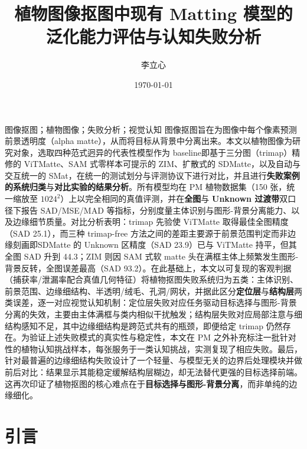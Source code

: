 \documentclass[supercite]{HustGraduPaper}
\title{植物图像抠图中现有 Matting 模型的\\泛化能力评估与认知失败分析} %
\author{李立心} %
\date{\today} %
\begin{document}
	\maketitle

	\clearpage %

\begin{cnabstract}{图像抠图；植物图像；失败分析；视觉认知}
	图像抠图旨在为图像中每个像素预测前景透明度（alpha matte），从而将目标从背景中分离出来。本文以植物图像为研究对象，选取四种范式迥异的代表性模型作为 baseline即基于三分图（trimap）精修的 ViTMatte、SAM 式零样本可提示的 ZIM、扩散式的 SDMatte，以及自动与交互统一的 SMat，在统一的测试划分与评测协议下进行对比，并且进行\textbf{失败案例的系统归类}与\textbf{对比实验的结果分析}。所有模型均在 PM 植物数据集（150 张，统一缩放至 $1024^2$）上以完全相同的真值评测，并在\textbf{全图}与 \textbf{Unknown 过渡带}双口径下报告 SAD/MSE/MAD 等指标，分别度量主体识别与图形-背景分离能力、以及边缘细节质量。对比分析表明：trimap 先验使 ViTMatte 取得最佳全图精度（SAD 25.1），而三种 trimap-free 方法之间的差距主要源于前景范围判定而非边缘刻画即SDMatte 的 Unknown 区精度（SAD 23.9）已与 ViTMatte 持平，但其全图 SAD 升到 44.3；ZIM 则因 SAM 式软 matte 头在满框主体上频繁发生图形-背景反转，全图误差最高（SAD 93.2）。在此基础上，本文以可复现的客观判据（捕获率/泄漏率配合真值几何特征）将植物抠图失败系统归为五类：主体识别、前景范围、边缘细结构、半透明/绒毛、孔洞/网状，并据此区分\textbf{定位层}与\textbf{结构层}两类误差，逐一对应视觉认知机制：定位层失败对应任务驱动目标选择与图形-背景分离的失效，主要由主体满框与类内相似干扰触发；结构层失败对应局部注意与细结构感知不足，其中边缘细结构是跨范式共有的瓶颈，即便给定 trimap 仍然存在。为验证上述失败模式的真实性与稳定性，本文在 PM 之外补充标注一批针对性的植物认知挑战样本，每张服务于一类认知挑战，实测复现了相应失败。最后，针对最普遍的边缘细结构失败设计了一个轻量、与模型无关的边界后处理模块并做前后对比：结果显示其能稳定缓解结构层糊边，却无法替代更强的目标选择前端。这再次印证了植物抠图的核心难点在于\textbf{目标选择与图形-背景分离}，而非单纯的边缘细化。
\end{cnabstract}

	\tableofcontents

	\clearpage%

	\section{引言}
\end{document}
